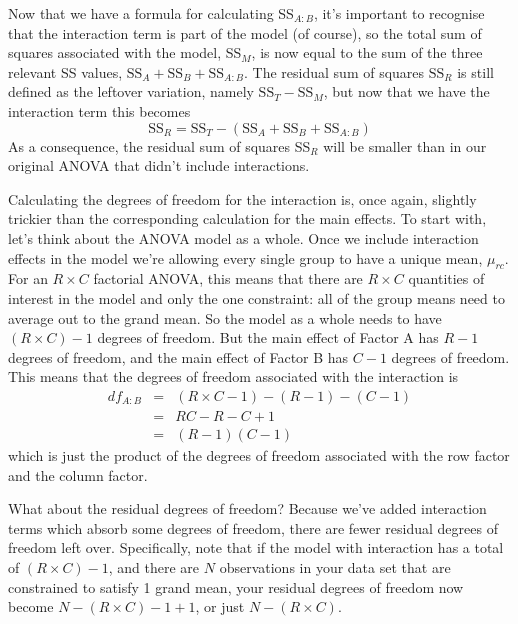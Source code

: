 \begin{mdframed}[style=MyFrame,nobreak=false]
Now that we have a formula for calculating SS$_{A:B}$, it's important to recognise that the interaction term is part of the model (of course), so the total sum of squares associated with the model, SS$_M$, is now equal to the sum of the three relevant SS values, $\mbox{SS}_A + \mbox{SS}_B + \mbox{SS}_{A:B}$. The residual sum of squares $\mbox{SS}_R$ is still defined as the leftover variation, namely $\mbox{SS}_T - \mbox{SS}_M$, but now that we have the interaction term this becomes
$$
\mbox{SS}_R = \mbox{SS}_T - (\mbox{SS}_A + \mbox{SS}_B + \mbox{SS}_{A:B})
$$ 
As a consequence, the residual sum of squares SS$_R$ will be smaller than in our original ANOVA that didn't include interactions.
\end{mdframed}


Calculating the degrees of freedom for the interaction is, once again, slightly trickier than the corresponding calculation for the main effects. To start with, let's think about the ANOVA model as a whole. Once we include interaction effects in the model we're allowing every single group to have a unique mean, $\mu_{rc}$. For an $R \times C$ factorial ANOVA, this means that there are $R \times C$ quantities of interest in the model and only the one constraint: all of the group means need to average out to the grand mean. So the model as a whole needs to have $(R\times C) - 1$ degrees of freedom. But the main effect of Factor A has $R-1$ degrees of freedom, and the main effect of Factor B has $C-1$ degrees of freedom. This means that the degrees of freedom associated with the interaction is 
\begin{eqnarray*}
df_{A:B} &=& (R\times C - 1) - (R - 1) - (C -1 ) \\
&=& RC - R - C + 1 \\
&=& (R-1)(C-1)
\end{eqnarray*}
which is just the product of the degrees of freedom associated with the row factor and the column factor.

What about the residual degrees of freedom? Because we've added interaction terms which absorb some degrees of freedom, there are fewer residual degrees of freedom left over. Specifically, note that if the model with interaction has a total of $(R\times C) - 1$, and there are $N$ observations in your data set that are constrained to satisfy 1 grand mean, your residual degrees of freedom now become $N-(R \times C)-1+1$, or just $N-(R \times C)$.

